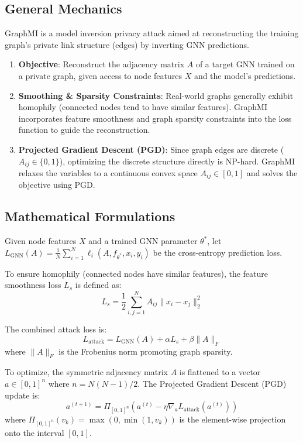 \documentclass{article}
\begin{document}
\subsection{General Mechanics}
GraphMI is a model inversion privacy attack aimed at reconstructing the training graph's private link structure (edges) by inverting GNN predictions.
\begin{enumerate}
    \item \textbf{Objective}: Reconstruct the adjacency matrix $A$ of a target GNN trained on a private graph, given access to node features $X$ and the model's predictions.
    \item \textbf{Smoothing \& Sparsity Constraints}: Real-world graphs generally exhibit homophily (connected nodes tend to have similar features). GraphMI incorporates feature smoothness and graph sparsity constraints into the loss function to guide the reconstruction.
    \item \textbf{Projected Gradient Descent (PGD)}: Since graph edges are discrete ($A_{ij} \in \{0, 1\}$), optimizing the discrete structure directly is NP-hard. GraphMI relaxes the variables to a continuous convex space $A_{ij} \in [0, 1]$ and solves the objective using PGD.
\end{enumerate}

\subsection{Mathematical Formulations}
Given node features $X$ and a trained GNN parameter $\theta^*$, let $L_{\text{GNN}}(A) = \frac{1}{N} \sum_{i=1}^N \ell_i(A, f_{\theta^*}, x_i, y_i)$ be the cross-entropy prediction loss.

To ensure homophily (connected nodes have similar features), the feature smoothness loss $L_s$ is defined as:
\begin{equation}
    L_s = \frac{1}{2} \sum_{i,j=1}^N A_{ij} \|x_i - x_j\|_2^2
\end{equation}

The combined attack loss is:
\begin{equation}
    L_{\text{attack}} = L_{\text{GNN}}(A) + \alpha L_s + \beta \|A\|_F
\end{equation}
where $\|A\|_F$ is the Frobenius norm promoting graph sparsity.

To optimize, the symmetric adjacency matrix $A$ is flattened to a vector $a \in [0, 1]^n$ where $n = N(N-1)/2$. The Projected Gradient Descent (PGD) update is:
\begin{equation}
    a^{(t+1)} = \Pi_{[0, 1]^n} \left( a^{(t)} - \eta \nabla_a L_{\text{attack}}(a^{(t)}) \right)
\end{equation}
where $\Pi_{[0, 1]^n}(v_k) = \max(0, \min(1, v_k))$ is the element-wise projection onto the interval $[0, 1]$.
\end{document}
